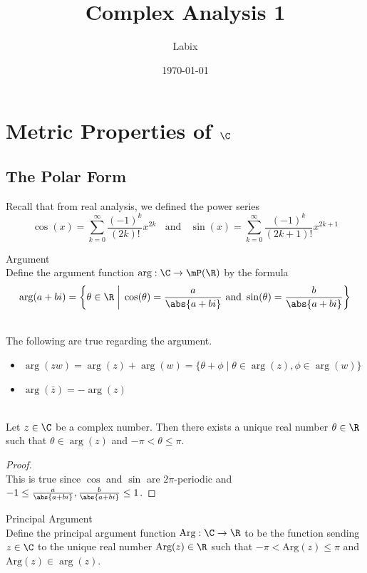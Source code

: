 \documentclass[a4paper]{article}
\title{Complex Analysis 1}
\author{Labix}
\date{\today}
\begin{document}
\maketitle
\begin{abstract}
\end{abstract}
\pagebreak
\tableofcontents

\pagebreak
\section{Metric Properties of $\C$}
\subsection{The Polar Form}
Recall that from real analysis, we defined the power series $$\cos(x)=\sum_{k=0}^\infty\frac{(-1)^k}{(2k)!}x^{2k}\;\;\text{ and }\;\;\sin(x)=\sum_{k=0}^\infty\frac{(-1)^k}{(2k+1)!}x^{2k+1}$$

\begin{defn}{Argument}{}\\
Define the argument function $\text{arg}:\C\to\mP(\R)$ by the formula $$\text{arg}(a+bi)=\left\{\theta\in\R\;\bigg{|}\;\cos(\theta)=\frac{a}{\abs{a+bi}}\text{ and }\sin(\theta)=\frac{b}{\abs{a+bi}}\right\}$$
\end{defn}

\begin{prp}{}{}\\
The following are true regarding the argument. 
\begin{itemize}
\item $\arg{(zw)}=\arg{(z)}+\arg{(w)}=\{\theta+\phi\;|\;\theta\in\arg(z), \phi\in\arg(w)\}$
\item $\arg{(\bar{z})}=-\arg{(z)}$
\end{itemize}
\end{prp}

\begin{lmm}{}{}\\
Let $z\in\C$ be a complex number. Then there exists a unique real number $\theta\in\R$ such that $\theta\in\arg(z)$ and $-\pi<\theta\leq\pi$. 
\begin{proof}\\
This is true since $\cos$ and $\sin$ are $2\pi$-periodic and $-1\leq\frac{a}{\abs{a+bi}},\frac{b}{\abs{a+bi}}\leq 1$. 
\end{proof}
\end{lmm}

\begin{defn}{Principal Argument}{}\\
Define the principal argument function $\text{Arg}:\C\to\R$ to be the function sending $z\in\C$ to the unique real number $\text{Arg}(z)\in\R$ such that $-\pi<\text{Arg}(z)\leq\pi$ and $\text{Arg}(z)\in\arg(z)$. 
\end{defn}
\end{document}
